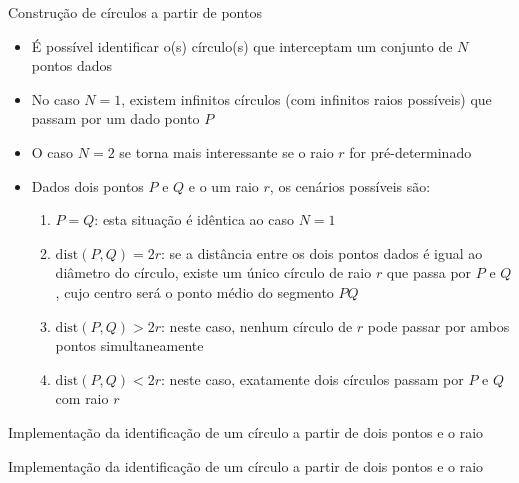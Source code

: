 \begin{frame}[fragile]{Construção de círculos a partir de pontos}

    \begin{itemize}
        \item É possível identificar o(s) círculo(s) que interceptam um conjunto de $N$ pontos dados
    
        \item No caso $N = 1$, existem infinitos círculos (com infinitos raios possíveis) que 
            passam por um dado ponto $P$

        \item O caso $N = 2$ se torna mais interessante se o raio $r$ for pré-determinado

        \item Dados dois pontos $P$ e $Q$ e o um raio $r$, os cenários possíveis são:

        \begin{enumerate}
            \item $P = Q$: esta situação é idêntica ao caso $N = 1$
            \item $\mathrm{dist}(P, Q) = 2r$: se a distância entre os dois pontos dados é igual ao 
                diâmetro do círculo, existe um único círculo de raio $r$ que passa por $P$ e $Q$, 
                    cujo centro será o ponto médio do segmento $PQ$
            \item $\mathrm{dist}(P, Q) > 2r$: neste caso, nenhum círculo de $r$ pode passar por 
                ambos pontos simultaneamente
            \item $\mathrm{dist}(P, Q) < 2r$: neste caso, exatamente dois círculos passam por $P$ e $Q$ com raio $r$
        \end{enumerate}
    \end{itemize}

\end{frame}

\begin{frame}[fragile]{Implementação da identificação de um círculo a partir de dois pontos e o raio}
\end{frame}

\begin{frame}[fragile]{Implementação da identificação de um círculo a partir de dois pontos e o raio}
\end{frame}

